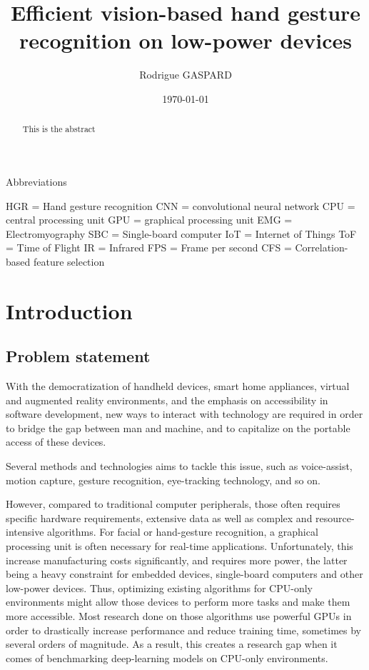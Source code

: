 \documentclass[12pt]{article}
\title{Efficient vision-based hand gesture recognition on low-power devices}
\author{Rodrigue GASPARD}
\date{\today}
\begin{document}
\maketitle

Abbreviations

HGR = Hand gesture recognition
CNN = convolutional neural network
CPU = central processing unit
GPU = graphical processing unit
EMG = Electromyography
SBC = Single-board computer
IoT = Internet of Things
ToF = Time of Flight
IR = Infrared
FPS = Frame per second
CFS = Correlation-based feature selection

\begin{abstract}
  This is the abstract
\end{abstract}

\section{Introduction}

\subsection{Problem statement}

With the democratization of handheld devices, smart home appliances,  virtual and augmented reality environments, and the emphasis on accessibility in software development, new ways to interact with technology are required in order to bridge the gap between man and machine, and to capitalize on the portable access of these devices. 

Several methods and technologies aims to tackle this issue, such as voice-assist, motion capture, gesture recognition, eye-tracking technology, and so on. 

However, compared to traditional computer peripherals, those often requires specific hardware requirements, extensive data as well as complex and resource-intensive algorithms. For facial or hand-gesture recognition, a graphical processing unit is often necessary for real-time applications. Unfortunately, this increase manufacturing costs significantly, and requires more power, the latter being a heavy constraint for embedded devices, single-board computers and other low-power devices.
Thus, optimizing existing algorithms for CPU-only environments might allow those devices to perform more tasks and make them more accessible. Most research done on those algorithms use powerful GPUs in order to drastically increase performance and reduce training time, sometimes by several orders of magnitude. As a result, this creates a research gap when it comes of benchmarking deep-learning models on CPU-only environments.
\end{document}
